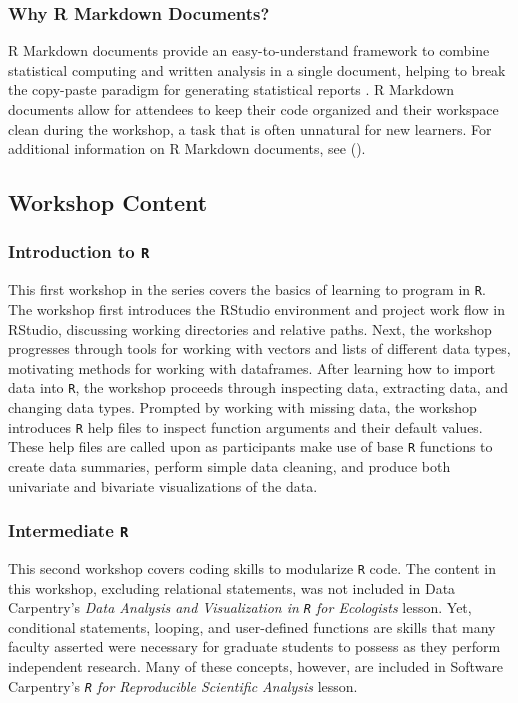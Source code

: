 \documentclass[12pt]{article}
\begin{document}
\subsubsection{Why R Markdown Documents?}

\noindent  R Markdown documents provide an easy-to-understand framework to
combine statistical computing and written analysis in a single document, helping
to break the copy-paste paradigm for generating statistical reports
\citep{mine-rmarkdown}. R Markdown documents allow for attendees to keep their
code organized and their workspace clean during the workshop, a task that is 
often unnatural for new learners. For additional
information on R Markdown documents, see \citeauthor{mine-rmarkdown} 
(\citeyear{mine-rmarkdown}). 

\subsection{Workshop Content}

\subsubsection{Introduction to \texttt{R}}
\label{sec:introR}

\noindent This first workshop in the series covers the basics of learning to
program in \texttt{R}. The workshop first introduces the RStudio environment and
project work flow in RStudio, discussing working directories and relative paths.
Next, the workshop progresses through tools for working with vectors and lists 
of different data types, motivating methods for working with dataframes. After
learning how to import data into \texttt{R}, the workshop proceeds through
inspecting data, extracting data, and changing data types. Prompted by working
with missing data, the workshop introduces \texttt{R} help files to inspect
function arguments and their default values. These help files are called upon
as participants make use of base \texttt{R} functions to create data summaries,
perform simple data cleaning, and produce both univariate and bivariate
visualizations of the data. 

\subsubsection{Intermediate \texttt{R}}
\label{sec:intermed}

\noindent This second workshop covers coding skills to modularize \texttt{R} code. 
The content in this workshop, excluding relational statements, was not
included in Data Carpentry's \emph{Data Analysis and Visualization in \texttt{R}
for Ecologists} lesson. Yet, conditional statements, looping, and user-defined
functions are skills that many faculty asserted were necessary for graduate
students to possess as they perform independent research. Many of these
concepts, however, are included in Software Carpentry's 
\emph{\texttt{R} for Reproducible Scientific Analysis} lesson. 
\end{document}
